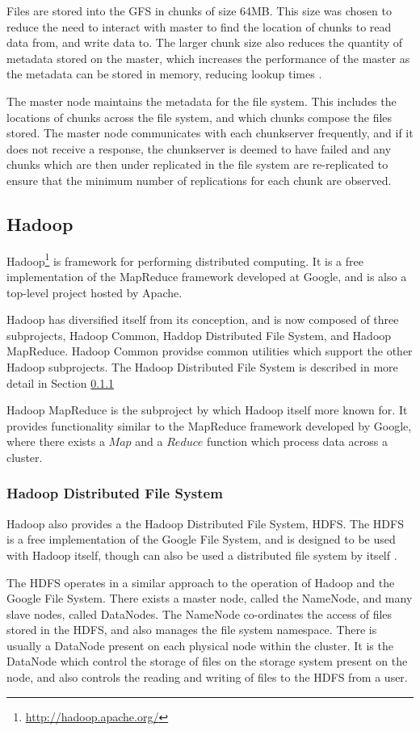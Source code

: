 Files are stored into the GFS in chunks of size 64MB. This size was chosen to reduce the need to interact with master to find the location of chunks to read data from, and write data to. The larger chunk size also reduces the quantity of metadata stored on the master, which increases the performance of the master as the metadata can be stored in memory, reducing lookup times \cite{gfs}.

The master node maintains the metadata for the file system. This includes the locations of chunks across the file system, and which chunks compose the files stored. The master node communicates with each chunkserver frequently, and if it does not receive a response, the chunkserver is deemed to have failed and any chunks which are then under replicated in the file system are re-replicated to ensure that the minimum number of replications for each chunk are observed.

\subsection{Hadoop}
Hadoop\footnote{\url{http://hadoop.apache.org/}} is framework for performing
distributed computing. It is a free implementation of the MapReduce framework
developed at Google, and is also a top-level project hosted by Apache.

Hadoop has diversified itself from its conception, and is now composed of three
subprojects, Hadoop Common, Haddop Distributed File System, and Hadoop
MapReduce. Hadoop Common providse common utilities which support the other
Hadoop subprojects. The Hadoop Distributed File System is described in more
detail in Section \ref{sec:hdfs}

Hadoop MapReduce is the subproject by which Hadoop itself more known for. It
provides functionality similar to the MapReduce framework developed by Google,
where there exists a $Map$ and a $Reduce$ function which process data across a
cluster.

\subsubsection{Hadoop Distributed File System}
\label{sec:hdfs}
Hadoop also provides a the Hadoop Distributed File System, HDFS. The HDFS is a free implementation of the Google File System, and is designed to be used with Hadoop itself, though can also be used a distributed file system by itself \cite{hdfs}.

The HDFS operates in a similar approach to the operation of Hadoop and the Google File System. There exists a master node, called the NameNode, and many slave nodes, called DataNodes. The NameNode co-ordinates the access of files stored in the HDFS, and also manages the file system namespace. There is usually a DataNode present on each physical node within the cluster. It is the DataNode which control the storage of files on the storage system present on the node, and also controls the reading and writing of files to the HDFS from a user.


